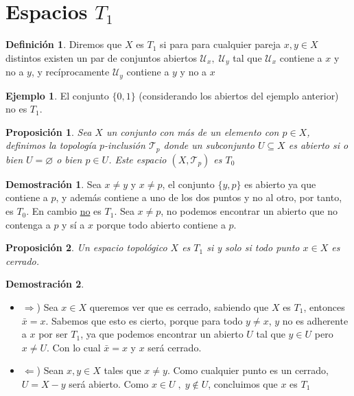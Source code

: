 \documentclass[12pt,twoside]{report}
\newcommand\mc[1]{\mathcal{#1}}
\theoremstyle{azul}
\theoremstyle{azul2}
\theoremstyle{plain}
\newtheorem*{prop}{Proposición}
\theoremstyle{definition}
\newtheorem*{eje}{Ejemplo}
\newtheorem*{defi}{Definición}
\newtheorem*{dem}{Demostración}
\theoremstyle{remark}
\begin{document}
\section{Espacios $T_1$} \label{espt1}
\begin{defi}
Diremos que $X$ es $T_1$ si para para cualquier pareja $x, y \in X$ distintos existen un par de conjuntos abiertos $\mc{U}_x,\; \mc{U}_y$ tal que $\mc{U}_x$ contiene a $x$ y no a $y$, y recíprocamente $\mc{U}_y$ contiene a $y$ y no a $x$\\
\end{defi}
\begin{eje}
El conjunto $\{0,1\}$ (considerando los abiertos del ejemplo anterior) no es $T_1$.
\end{eje}
\begin{prop}
Sea $X$ un conjunto con más de un elemento con $p \in X$, definimos la topología $p$-inclusión $\mc{T}_p$ donde un subconjunto $U \subseteq X$ es abierto si o bien $U = \varnothing$ o bien $p \in U$. Este espacio $(X, \mc{T}_p)$ es $T_0$
\end{prop}
\begin{dem}
Sea $x\neq y$ y $x\neq p$, el conjunto $\{y,p\}$ es abierto ya que contiene a $p$, y además contiene a uno de los dos puntos y no al otro, por tanto, es $T_0$. En cambio \underline{no} es $T_1$. Sea $x\neq p$, no podemos encontrar un abierto que no contenga a $p$ y sí a $x$ porque todo abierto contiene a $p$.
\end{dem}
\begin{prop}
Un espacio topológico $X$ es $T_1$ si y solo si todo punto $x \in X$ es cerrado.
\end{prop}
\begin{dem}\:\vspace{-5mm}
\begin{itemize}
    \item $\Rightarrow$) Sea $x \in X$ queremos ver que es cerrado, sabiendo que 
    $X$ es $T_1$, entonces $\bar{x}=x$. Sabemos que esto es cierto, porque para todo $y \neq x$, $y$ no es adherente a $x$ por ser $T_1$, ya que podemos encontrar un abierto $U$ tal que $y \in U$ pero $x \neq U$. Con lo cual $\bar{x}=x$ y $x$ será cerrado.
    \item $\Leftarrow$) Sean  $x,y \in X$ tales que $x \neq y$. Como cualquier punto es un cerrado,  $U = X - y$ será abierto. Como $x \in U\; , \; y\nin U$, concluimos que $x$ es $T_1$
\end{itemize}
\end{dem}
\end{document}
